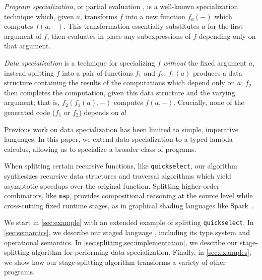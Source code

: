 \emph{Program specialization}, or partial evaluation \cite{futamura71,jones96},
is a well-known specialization technique which, given $a$, transforms $f$ into a
new function $f_a(-)$ which computes $f(a,-)$. This transformation essentially
substitutes $a$ for the first argument of $f$, then evaluates in place any
subexpressions of $f$ depending only on that argument.

\emph{Data specialization} \cite{knoblock96,JS86-staging} 
is a technique for specializing $f$ \emph{without} the fixed argument $a$,
instead splitting $f$ into a pair of functions $f_1$ and $f_2$. $f_1(a)$
produces a data structure containing the results of the computations which
depend only on $a$; $f_2$ then completes the computation, given this data
structure and the varying argument; that is, $f_2(f_1(a),-)$ computes $f(a,-)$.
Crucially, none of the generated code ($f_1$ or $f_2$) depends on $a$!

Previous work on data specialization has been limited to simple, imperative
languages. In this paper, we extend data specialization to a typed lambda
calculus, allowing us to specialize a broader class of programs.

When splitting certain recursive functions, like \texttt{quickselect}, our
algorithm synthesizes recursive data structures and traversal algorithms which
yield asymptotic speedups over the original function. Splitting higher-order
combinators, like \texttt{map}, provides compositional reasoning at the source
level while cross-cutting fixed runtime stages, as in graphical shading
languages like Spark~\cite{Foley:2011}.

We start in \ref{sec:example} with an extended example of splitting
\texttt{quickselect}.
In \ref{sec:semantics}, we describe our staged language \lang, including its
type system and operational semantics.
In \ref{sec:splitting,sec:implementation}, we describe our stage-splitting
algorithm for performing data specialization.
Finally, in \ref{sec:examples}, we show how our stage-splitting algorithm
transforms a variety of other programs.
